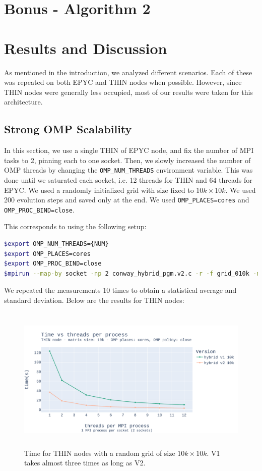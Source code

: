 \documentclass{report}
\begin{document}
\section{Bonus - Algorithm 2}
\section{Results and Discussion}

As mentioned in the introduction, we analyzed different scenarios. 
Each of these was repeated on both EPYC and THIN nodes when possible. 
However, since THIN nodes were generally less occupied, most of our 
results were taken for this architecture. 

\subsection{Strong OMP Scalability}

In this section, we use a single THIN of EPYC node, and fix the number of MPI 
tasks to 2, pinning each to one socket. Then, we slowly increased the 
number of OMP threads by changing the \texttt{OMP\_NUM\_THREADS} environment 
variable. This was done until we saturated each socket, i.e. 12 threads for THIN 
and 64 threads for EPYC. We used a randomly initialized grid with size fixed to 
$10k \times 10k$. We used 200 evolution steps and saved only at the end. 
We used \texttt{OMP\_PLACES=cores} and \texttt{OMP\_PROC\_BIND=close}.

This corresponds to using the following setup:  

\begin{lstlisting}[language=bash]
$export OMP_NUM_THREADS={NUM}
$export OMP_PLACES=cores
$export OMP_PROC_BIND=close
$mpirun --map-by socket -np 2 conway_hybrid_pgm.v2.c -r -f grid_010k -n 200 -s 0 -e 1
\end{lstlisting}

We repeated the measurements 10 times to obtain a statistical average and standard 
deviation. Below are the results for THIN nodes:

\begin{figure}[H]
\centering
\includegraphics[width=14cm, height=7cm]{./images/strong_OMP_thin_hybrid_grid_010k.pdf}
\caption{\label{fig:strongomp10kspeedupthin} Time for THIN nodes with a 
random grid of size $10k \times 10k$. V1 takes almost three times as long as V2.}
\end{figure}
\end{document}

